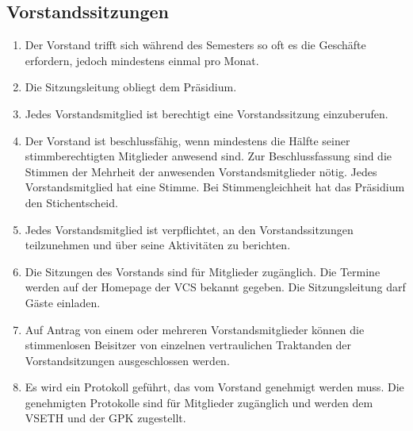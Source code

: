 \subsection{Vorstandssitzungen}
\begin{enumerate}
\item Der Vorstand trifft sich während des Semesters so oft es die Geschäfte erfordern, jedoch mindestens einmal pro Monat.
\item Die Sitzungsleitung obliegt dem Präsidium.
 \item  Jedes Vorstandsmitglied ist berechtigt eine Vorstandssitzung einzuberufen. 
\item Der Vorstand ist beschlussfähig, wenn mindestens die Hälfte seiner stimmberechtigten Mitglieder anwesend sind. Zur Beschlussfassung sind die Stimmen der Mehrheit der anwesenden Vorstandsmitglieder nötig. Jedes Vorstandsmitglied hat eine Stimme. Bei Stimmengleichheit hat das Präsidium den Stichentscheid.
\item Jedes Vorstandsmitglied ist verpflichtet, an den Vorstandssitzungen teilzunehmen und über seine Aktivitäten zu berichten.
\item Die Sitzungen des Vorstands sind für Mitglieder zugänglich. Die Termine werden auf der Homepage der VCS bekannt gegeben. Die Sitzungsleitung darf Gäste einladen.
\item Auf Antrag von einem oder mehreren Vorstandsmitglieder können die stimmenlosen Beisitzer von einzelnen vertraulichen Traktanden der Vorstandsitzungen ausgeschlossen werden.
\item Es wird ein Protokoll geführt, das vom Vorstand genehmigt werden muss. Die genehmigten Protokolle sind für Mitglieder zugänglich und werden dem VSETH und der GPK zugestellt.
\end{enumerate}

